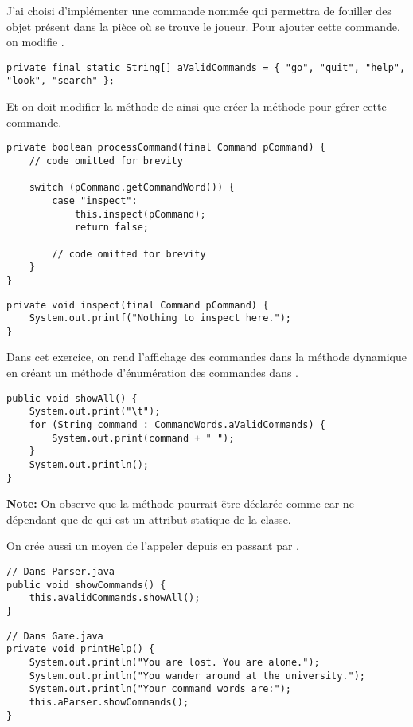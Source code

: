 \begin{exercise}[subtitle=Commande search]
 
 J'ai choisi d'implémenter une commande nommée  qui permettra de fouiller des objet présent dans la pièce où se trouve le joueur. Pour ajouter cette commande, on modifie .
 
\begin{verbatim}
private final static String[] aValidCommands = { "go", "quit", "help", "look", "search" };
\end{verbatim}

Et on doit modifier la méthode  de  ainsi que créer la méthode pour gérer cette commande.

\begin{verbatim}
private boolean processCommand(final Command pCommand) {
    // code omitted for brevity

    switch (pCommand.getCommandWord()) {
        case "inspect":
            this.inspect(pCommand);
            return false;

        // code omitted for brevity
    }
}
\end{verbatim}

\begin{verbatim}
private void inspect(final Command pCommand) {
    System.out.printf("Nothing to inspect here.");
}
\end{verbatim}
\end{exercise}


\begin{exercise}[subtitle=showAll et showCommands]

Dans cet exercice, on rend l'affichage des commandes dans la méthode  dynamique en créant un méthode d'énumération des commandes dans .


\begin{verbatim}
public void showAll() {
    System.out.print("\t");
    for (String command : CommandWords.aValidCommands) {
        System.out.print(command + " ");
    }
    System.out.println();
}
\end{verbatim}

\textbf{Note:} On observe que la méthode  pourrait être déclarée comme  car ne dépendant que de  qui est un attribut statique de la classe.

On crée aussi un moyen de l'appeler depuis  en passant par .

\begin{verbatim}
// Dans Parser.java
public void showCommands() {
    this.aValidCommands.showAll();
}
\end{verbatim}

\begin{verbatim}
// Dans Game.java
private void printHelp() {
    System.out.println("You are lost. You are alone.");
    System.out.println("You wander around at the university.");
    System.out.println("Your command words are:");
    this.aParser.showCommands();
}
\end{verbatim}
\end{exercise}

